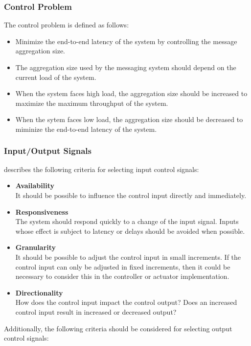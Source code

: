 \subsubsection{Control Problem}
The control problem is defined as follows:

\begin{itemize}
	\item Minimize the end-to-end latency of the system by controlling the message aggregation size.
	\item The aggregation size used by the messaging system should depend on the current load of the system.
	\item When the system faces high load, the aggregation size should be increased to maximize the maximum throughput of the system.
	\item When the sytem faces low load, the aggregation size should be decreased to miminize the end-to-end latency of the system.
\end{itemize}
\subsubsection{Input/Output Signals}

\cite{Janert:2013aa} describes the following criteria for selecting input control signals:
\begin{itemize}
	\item \textbf{Availability}\\
	It should be possible to influence the control input directly and immediately.
	\item \textbf{Responsiveness}\\
	The system should respond quickly to a change of the input signal. Inputs whose effect is subject to latency or delays should be avoided when possible.
	\item \textbf{Granularity}\\
	It should be possible to adjust the control input in small increments. If the control input can only be adjusted in fixed increments, then it could be necessary to consider this in the controller or actuator implementation.
	\item \textbf{Directionality}\\
	How does the control input impact the control output? Does an increased control input result in increased or decreased output?
\end{itemize}

Additionally, the following criteria should be considered for selecting output control signals:


